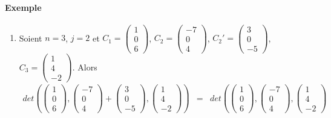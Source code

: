 \paragraph{Exemple}
\begin{enumerate}
  \item Soient $n = 3$, $j = 2$ et $C_1 = \begin{pmatrix} 1 \\ 0 \\ 6 \end{pmatrix}$, $C_2 = \begin{pmatrix} -7 \\ 0 \\ 4 \end{pmatrix}$, $C_2' = \begin{pmatrix} 3 \\ 0 \\ -5 \end{pmatrix}$, $C_3 = \begin{pmatrix} 1 \\ 4 \\ -2 \end{pmatrix}$. Alors
    \begin{eqnarray*}
      det\left(
        \begin{pmatrix} 1 \\ 0 \\ 6 \end{pmatrix}, 
        \begin{pmatrix} -7 \\ 0 \\ 4 \end{pmatrix} + \begin{pmatrix} 3 \\ 0 \\ -5 \end{pmatrix}, 
        \begin{pmatrix} 1 \\ 4 \\ -2 \end{pmatrix} 
      \right) &=& det\left(
        \begin{pmatrix} 1 \\ 0 \\ 6 \end{pmatrix}, 
        \begin{pmatrix} -7 \\ 0 \\ 4 \end{pmatrix}, 
        \begin{pmatrix} 1 \\ 4 \\ -2 \end{pmatrix}

\end{eqnarray*}
\end{enumerate}
